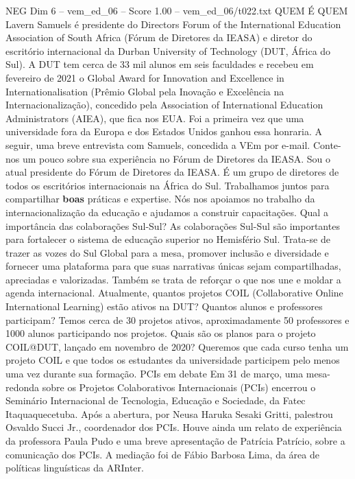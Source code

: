 \begin{textsample}{NEG Dim 6 – vem\_ed\_06 – Score 1.00 – vem\_ed\_06/t022.txt}  \label{ex:f6_neg_084}
QUEM É QUEM Lavern Samuels é presidente do Directors Forum of the International Education Association of South Africa (Fórum de Diretores da IEASA) e diretor do escritório internacional da Durban University of Technology (DUT, África do Sul).
A DUT tem cerca de 33 mil alunos em seis faculdades e recebeu em fevereiro de 2021 o Global Award for Innovation and Excellence in Internationalisation (Prêmio Global pela Inovação e Excelência na Internacionalização), concedido pela Association of International Education Administrators (AIEA), que fica nos EUA.
Foi a primeira vez que uma universidade fora da Europa e dos Estados Unidos ganhou essa honraria.
A seguir, uma breve entrevista com Samuels, concedida a VEm por e-mail.
Conte-nos um pouco sobre sua experiência no Fórum de Diretores da IEASA.
Sou o atual presidente do Fórum de Diretores da IEASA.
É um grupo de diretores de todos os escritórios internacionais na África do Sul.
Trabalhamos juntos para compartilhar \textbf{boas} práticas e expertise.
Nós nos apoiamos no trabalho da internacionalização da educação e ajudamos a construir capacitações.
Qual a importância das colaborações Sul-Sul?
As colaborações Sul-Sul são importantes para fortalecer o sistema de educação superior no Hemisfério Sul.
Trata-se de trazer as vozes do Sul Global para a mesa, promover inclusão e diversidade e fornecer uma plataforma para que suas narrativas únicas sejam compartilhadas, apreciadas e valorizadas.
Também se trata de reforçar o que nos une e moldar a agenda internacional.
Atualmente, quantos projetos COIL (Collaborative Online International Learning) estão ativos na DUT?
Quantos alunos e professores participam?
Temos cerca de 30 projetos ativos, aproximadamente 50 professores e 1000 alunos participando nos projetos.
Quais são os planos para o projeto COIL@DUT, lançado em novembro de 2020?
Queremos que cada curso tenha um projeto COIL e que todos os estudantes da universidade participem pelo menos uma vez durante sua formação.
PCIs em debate Em 31 de março, uma mesa-redonda sobre os Projetos Colaborativos Internacionais (PCIs) encerrou o Seminário Internacional de Tecnologia, Educação e Sociedade, da Fatec Itaquaquecetuba.
Após a abertura, por Neusa Haruka Sesaki Gritti, palestrou Osvaldo Succi Jr., coordenador dos PCIs.
Houve ainda um relato de experiência da professora Paula Pudo e uma breve apresentação de Patrícia Patrício, sobre a comunicação dos PCIs.
A mediação foi de Fábio Barbosa Lima, da área de políticas linguísticas da ARInter.

\end{textsample}
